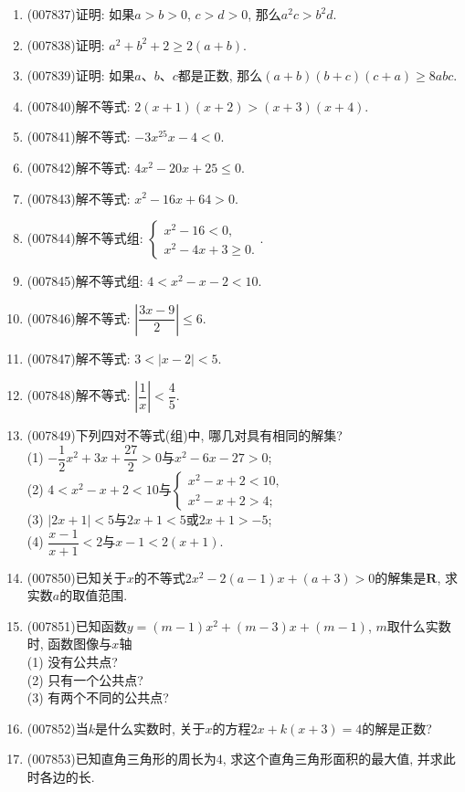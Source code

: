 \documentclass[10pt,a4paper]{article}
\begin{document}
\begin{enumerate}[1.]
\item {\tiny (007837)}证明: 如果$a>b>0$, $c>d>0$, 那么$a^2c>b^2d$.
\item {\tiny (007838)}证明: $a^2+b^2+2\ge 2(a+b)$.
\item {\tiny (007839)}证明: 如果$a$、$b$、$c$都是正数, 那么$(a+b)(b+c)(c+a)\ge 8abc$.
\item {\tiny (007840)}解不等式: $2(x+1)(x+2)>(x+3)(x+4)$.
\item {\tiny (007841)}解不等式: $-3x^25x-4<0$.
\item {\tiny (007842)}解不等式: $4x^2-20x+25\le 0$.
\item {\tiny (007843)}解不等式: $x^2-16x+64>0$.
\item {\tiny (007844)}解不等式组: $\begin{cases} x^2-16<0, \\ x^2-4x+3\ge 0. \end{cases}$.
\item {\tiny (007845)}解不等式组: $4<x^2-x-2<10$.
\item {\tiny (007846)}解不等式: $|\dfrac{3x-9}2|\le 6$.
\item {\tiny (007847)}解不等式: $3<|x-2|<5$.
\item {\tiny (007848)}解不等式: $|\dfrac 1x|<\dfrac 45$.
\item {\tiny (007849)}下列四对不等式(组)中, 哪几对具有相同的解集?\\
(1) $-\dfrac 12x^2+3x+\dfrac{27}2>0$与$x^2-6x-27>0$;\\
(2) $4<x^2-x+2<10$与$\begin{cases} x^2-x+2<10, \\ x^2-x+2>4; \end{cases}$\\
(3) $|2x+1|<5$与$2x+1<5$或$2x+1>-5$;\\
(4) $\dfrac{x-1}{x+1}<2$与$x-1<2(x+1)$.
\item {\tiny (007850)}已知关于$x$的不等式$2x^2-2(a-1)x+(a+3)>0$的解集是$\mathbf{R}$, 求实数$a$的取值范围.
\item {\tiny (007851)}已知函数$y=(m-1)x^2+(m-3)x+(m-1)$, $m$取什么实数时, 函数图像与$x$轴\\
(1) 没有公共点?\\
(2) 只有一个公共点?\\
(3) 有两个不同的公共点?
\item {\tiny (007852)}当$k$是什么实数时, 关于$x$的方程$2x+k(x+3)=4$的解是正数?
\item {\tiny (007853)}已知直角三角形的周长为$4$, 求这个直角三角形面积的最大值, 并求此时各边的长.

\end{enumerate}
\end{document}
